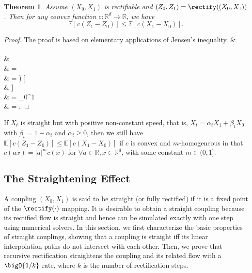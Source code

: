 \documentclass[11pt]{article}
\newtheorem{thm}{Theorem}[section]
\newcommand{\med}[1]{\textcolor{magenta}{#1}}
\newcommand{\ant}[1]{~~~~~~~\text{\med{//#1}}}
\newcommand{\E}{\mathbb{E}}
\newcommand{\RR}{\mathbb{R}}
\newcommand{\abs}[1]{\left|#1\right|}
\def\bb#1\ee{\begin{align*}#1\end{align*}}
\begin{document}
\begin{thm} \label{thm:cost}
Assume $(X_0,X_1)$ is rectifiable and $(Z_0,Z_1) = \rectify((X_0,X_1))$. 
Then for any convex function $c\colon \RR^d\to \RR$, we have 
$$\E[c(Z_1 - Z_0)] \leq \E[c(X_1 - X_0)].$$ 
\end{thm} 
\begin{proof} 
The proof is based on elementary applications of Jensen's inequality. 
\bb
\E\left [c(Z_1 - Z_0)\right]
& = \E {}  \ant{as $\d Z_t = \vofX(Z_t,t)\dt$}\\
&\leq \E {}  \ant{convexity of $c$, Jensen's inequality}\\
& = \E {}  \ant{$X_t$ and $Z_t$ shares the same marginals}\\
& =  \E \left[ \int_0^1 c\left ( \E\left [(X_1-X_0)~|~X_t \right ] \right) \dt \right ] \ant{definition of $\vofX$}\\
& \leq  \E \left[ \int_0^1  \E\left [ c\left(X_1-X_0 \right) |~X_t \right ]   \dt \right ] \ant{convexity of $c$, Jensen's inequality}\\
& = \int_0^1\E{} \dt  \ant{$\E[\E[(X_1-X_0) | X_t]] = \E[(X_1-X_0)]$}\\
& = \E{}. 
\ee 
\end{proof} 
 If $X_t$ is straight but with positive non-constant speed, that is, 
$X_t = \alpha_t X_1 + \beta_t X_0$ with $\beta_t = 1-\alpha_t$ and $\dot \alpha_t\geq0$, 
then we still have $\E[c(Z_1-Z_0)] \leq \E[c(X_1-X_0)]$ 
if $c$ is convex and $m$-homogeneous in that $c(a x) = \abs{a}^m c(x)$ 
for $\forall a\in \RR, x\in \RR^d$, with 
some constant $m\in(0, 1]$. 
 





\subsection{The Straightening Effect}
\label{sec:straight}


A coupling $(X_0,X_1)$ 
is said to be straight 
(or fully rectified)  if 
it is a fixed point of the $\rectify(\cdot)$ mapping.
It is desirable to obtain a straight coupling because its rectified flow is straight and 
hence can be simulated exactly with one step using numerical solvers. 
In this section, 
we first characterize the basic properties of straight couplings, showing that a coupling is straight iff its linear interpolation paths do not intersect with each other. Then, we prove that recursive rectification 
straightens the coupling and its related flow 
with a $\bigO{1/k}$ rate, where $k$ is the number of rectification steps. %
\end{document}
